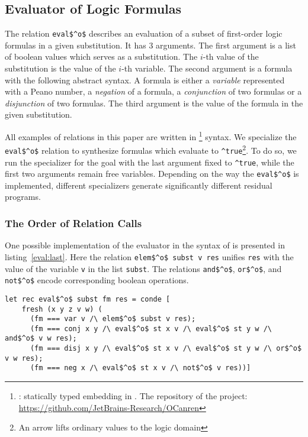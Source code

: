 \subsection{Evaluator of Logic Formulas}

The relation \lstinline{eval$^o$} describes an evaluation of a subset of first-order logic formulas in a given substitution.
It has 3 arguments.
The first argument is a list of boolean values which serves as a substitution.
The $i$-th value of the substitution is the value of the $i$-th variable.
The second argument is a formula with the following abstract syntax.
A formula is either a \emph{variable} represented with a Peano number, a \emph{negation} of a formula, a \emph{conjunction} of two formulas or a \emph{disjunction} of two formulas.
The third argument is the value of the formula in the given substitution.

All examples of \mk{} relations in this paper are written in \oc{}\footnote{\oc{}: statically typed \mk{} embedding in \ocaml{}. The repository of the project: \url{https://github.com/JetBrains-Research/OCanren}} syntax.
We specialize the \lstinline{eval$^o$} relation to synthesize formulas which evaluate to \lstinline{^true}\footnote{An arrow lifts ordinary values to the logic domain}.
To do so, we run the specializer for the goal with the last argument fixed to \lstinline{^true}, while the first two arguments remain free variables.
Depending on the way the \lstinline{eval$^o$} is implemented, different specializers generate significantly different residual programs.

\subsubsection{The Order of Relation Calls}

One possible implementation of the evaluator in the syntax of \oc{} is presented in listing~\ref{eval:last}.
Here the relation \lstinline{elem$^o$ subst v res} unifies \lstinline{res} with the value of the variable \lstinline{v} in the list \lstinline{subst}.
The relations \lstinline{and$^o$}, \lstinline{or$^o$}, and \lstinline{not$^o$} encode corresponding boolean operations.

\begin{figure*}[!h]
  \centering
  \begin{minipage}{0.8\textwidth}
    \begin{lstlisting}[label={eval:last}, caption={Evaluator of formulas with boolean operation last}, captionpos=b, frame=tb]
  let rec eval$^o$ subst fm res = conde [
    fresh (x y z v w) (
      (fm === var v /\ elem$^o$ subst v res);
      (fm === conj x y /\ eval$^o$ st x v /\ eval$^o$ st y w /\ and$^o$ v w res);
      (fm === disj x y /\ eval$^o$ st x v /\ eval$^o$ st y w /\ or$^o$ v w res);
      (fm === neg x /\ eval$^o$ st x v /\ not$^o$ v res))]
    \end{lstlisting}
  \end{minipage}
\end{figure*}

